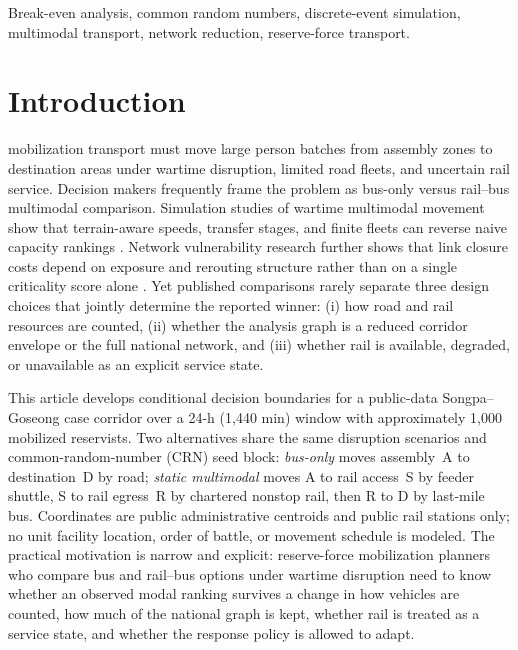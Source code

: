 \documentclass{ieeeaccess}
\begin{document}
\begin{keywords}
Break-even analysis, common random numbers, discrete-event simulation, multimodal transport, network reduction, reserve-force transport.
\end{keywords}

\titlepgskip=-21pt

\maketitle

\section{Introduction}
\label{sec:introduction}
 mobilization transport must move large person batches from assembly zones to destination areas under wartime disruption, limited road fleets, and uncertain rail service. Decision makers frequently frame the problem as bus-only versus rail--bus multimodal comparison. Simulation studies of wartime multimodal movement show that terrain-aware speeds, transfer stages, and finite fleets can reverse naive capacity rankings \cite{b1}. Network vulnerability research further shows that link closure costs depend on exposure and rerouting structure rather than on a single criticality score alone \cite{b10,b19}. Yet published comparisons rarely separate three design choices that jointly determine the reported winner: (i) how road and rail resources are counted, (ii) whether the analysis graph is a reduced corridor envelope or the full national network, and (iii) whether rail is available, degraded, or unavailable as an explicit service state.

This article develops conditional decision boundaries for a public-data Songpa--Goseong case corridor over a 24-h (1{,}440 min) window with approximately 1{,}000 mobilized reservists. Two alternatives share the same disruption scenarios and common-random-number (CRN) seed block: \emph{bus-only} moves assembly~A to destination~D by road; \emph{static multimodal} moves A to rail access~S by feeder shuttle, S to rail egress~R by chartered nonstop rail, then R to D by last-mile bus. Coordinates are public administrative centroids and public rail stations only; no unit facility location, order of battle, or movement schedule is modeled. The practical motivation is narrow and explicit: reserve-force mobilization planners who compare bus and rail--bus options under wartime disruption need to know whether an observed modal ranking survives a change in how vehicles are counted, how much of the national graph is kept, whether rail is treated as a service state, and whether the response policy is allowed to adapt.
\end{document}

